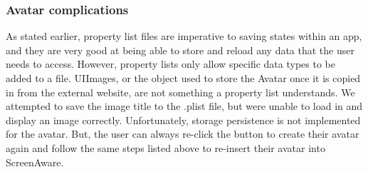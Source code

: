 \documentclass[12pt, title page, manuscript, nonacm]{acmart}
\begin{document}
\subsubsection*{Avatar complications}
As stated earlier, property list files are imperative to saving states within an app, and they are very good at being able to store and reload any data that the user needs to access. However, property lists only allow specific data types to be added to a file. UIImages, or the object used to store the Avatar once it is copied in from the external website, are not something a property list understands. We attempted to save the image title to the .plist file, but were unable to load in and display an image correctly. Unfortunately, storage persistence is not implemented for the avatar. But, the user can always re-click the button to create their avatar again and follow the same steps listed above to re-insert their avatar into ScreenAware.
\end{document}
